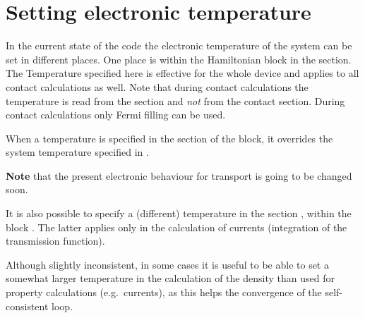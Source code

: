 \section{Setting electronic temperature}

In the current state of the code the electronic temperature of the system can be
set in different places. One place is within the Hamiltonian block in the
 section. The Temperature specified here is effective for the whole
device and applies to all contact calculations as well.  Note that during
contact calculations the temperature is read from the  section and
{\em not} from the contact section.  During contact calculations only Fermi
filling can be used.

When a temperature is specified in the  section of the
 block, it overrides the system temperature specified in
.

{\bf Note} that the present electronic behaviour for transport is going to be
changed soon.

It is also possible to specify a (different) temperature in the section
, within the block . The latter applies only in
the calculation of currents (integration of the transmission function).

Although slightly inconsistent, in some cases it is useful to be able to set a
somewhat larger temperature in the calculation of the density than used for
property calculations (e.g.\ currents), as this helps the convergence of the
self-consistent loop.


%

